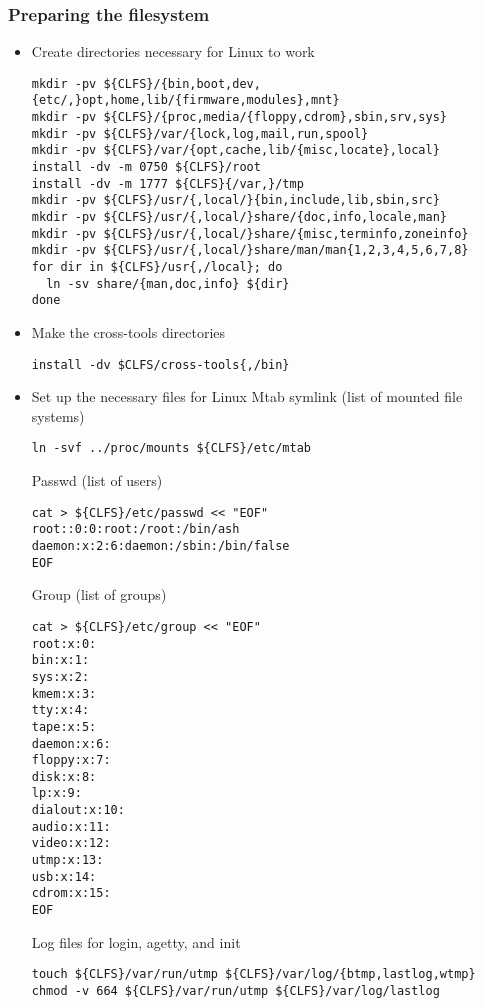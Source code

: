  \subsubsection{Preparing the filesystem}
\begin{itemize}
  \item Create directories necessary for Linux to work
\begin{lstlisting}
mkdir -pv ${CLFS}/{bin,boot,dev,{etc/,}opt,home,lib/{firmware,modules},mnt}
mkdir -pv ${CLFS}/{proc,media/{floppy,cdrom},sbin,srv,sys}
mkdir -pv ${CLFS}/var/{lock,log,mail,run,spool}
mkdir -pv ${CLFS}/var/{opt,cache,lib/{misc,locate},local}
install -dv -m 0750 ${CLFS}/root
install -dv -m 1777 ${CLFS}{/var,}/tmp
mkdir -pv ${CLFS}/usr/{,local/}{bin,include,lib,sbin,src}
mkdir -pv ${CLFS}/usr/{,local/}share/{doc,info,locale,man}
mkdir -pv ${CLFS}/usr/{,local/}share/{misc,terminfo,zoneinfo}
mkdir -pv ${CLFS}/usr/{,local/}share/man/man{1,2,3,4,5,6,7,8}
for dir in ${CLFS}/usr{,/local}; do
  ln -sv share/{man,doc,info} ${dir}
done
\end{lstlisting}
  \item Make the cross-tools directories
    \begin{lstlisting}
install -dv $CLFS/cross-tools{,/bin}
    \end{lstlisting}
 \item Set up the necessary files for Linux
 \subitem Mtab symlink (list of mounted file systems)
 \begin{lstlisting}
ln -svf ../proc/mounts ${CLFS}/etc/mtab
\end{lstlisting}
  \subitem Passwd (list of users)
\begin{lstlisting}
cat > ${CLFS}/etc/passwd << "EOF"
root::0:0:root:/root:/bin/ash
daemon:x:2:6:daemon:/sbin:/bin/false
EOF
\end{lstlisting}
  \subitem Group (list of groups)
\begin{lstlisting}
cat > ${CLFS}/etc/group << "EOF"
root:x:0:
bin:x:1:
sys:x:2:
kmem:x:3:
tty:x:4:
tape:x:5:
daemon:x:6:
floppy:x:7:
disk:x:8:
lp:x:9:
dialout:x:10:
audio:x:11:
video:x:12:
utmp:x:13:
usb:x:14:
cdrom:x:15:
EOF
\end{lstlisting}
  \subitem Log files for login, agetty, and init
  \begin{lstlisting}
touch ${CLFS}/var/run/utmp ${CLFS}/var/log/{btmp,lastlog,wtmp}
chmod -v 664 ${CLFS}/var/run/utmp ${CLFS}/var/log/lastlog
  \end{lstlisting}

\end{itemize}



